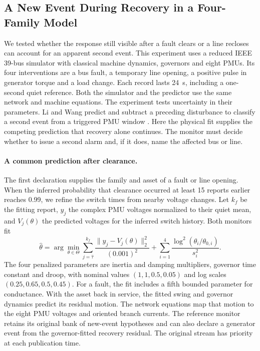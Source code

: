 \subsection{A New Event During Recovery in a Four-Family Model}
\label{app:four-family-conditional}

We tested whether the response still visible after a fault clears or a
line recloses can account for an apparent second event. This experiment
uses a reduced IEEE 39-bus simulator with classical machine dynamics,
governors and eight PMUs. Its four interventions are a bus fault, a
temporary line opening, a positive pulse in generator torque and a load
change. Each record lasts 24~s, including a one-second quiet reference.
Both the simulator and the predictor use the same network and machine
equations. The experiment tests uncertainty in their parameters.
Li and Wang predict and subtract a preceding disturbance to classify a
second event from a triggered PMU window \cite{liwang2019successive}.
Here the physical fit supplies the competing prediction that recovery alone
continues. The monitor must decide whether to issue a second alarm and,
if it does, name the affected bus or line.

\paragraph{A common prediction after clearance.}
The first declaration supplies the family and asset of a fault or line
opening. When the inferred probability that clearance occurred at least
15 reports earlier reaches 0.99, we refine the switch times from nearby
voltage changes. Let $k_f$ be the fitting report, $y_j$ the complex PMU
voltages normalized to their quiet mean, and $V_j(\theta)$ the predicted
voltages for the inferred switch history. Both monitors fit
\[
 \widehat\theta=\arg\min_{\theta\in\Theta}
 \sum_{j=\widehat\tau}^{k_f}
 \frac{\|y_j-V_j(\theta)\|_2^2}{(0.001)^2}
 +\sum_{i=1}^{4}\frac{\log^2(\theta_i/\theta_{0,i})}{s_i^2}.
\]
The four penalized parameters are inertia and damping multipliers,
governor time constant and droop, with nominal values $(1,1,0.5,0.05)$
and log scales $(0.25,0.65,0.5,0.45)$. For a fault, the fit includes a
fifth bounded parameter for conductance. With the asset back in service,
the fitted swing and governor dynamics predict its residual motion.
The network equations map that motion to the eight PMU voltages and
oriented branch currents. The reference monitor retains its original bank of new-event hypotheses
and can also declare a generator event from the governor-fitted recovery
residual. The original stream has priority at
each publication time.

